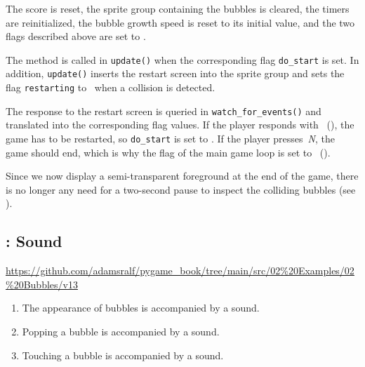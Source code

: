 The score is reset, the sprite group containing the bubbles is cleared, the timers are reinitialized, the bubble growth speed is reset to its initial value, and the two flags described above are set to \false.


The method is called in \texttt{update()} when the corresponding flag \texttt{do\_start} is set. In addition, \texttt{update()} inserts the restart screen into the sprite group and sets the flag \texttt{restarting} to \true\ when a collision is detected.

\newpage
{}  

The response to the restart screen is queried in \texttt{watch\_for\_events()} and translated into the corresponding flag values. If the player responds with~ (), the game has to be restarted, so \texttt{do\_start} is set to \true. If the player presses~\emph{N}, the game should end, which is why the flag of the main game loop is set to \false\ ().

  
Since we now display a semi-transparent foreground at the end of the game, there is no longer any need for a two-second pause to inspect the colliding bubbles (see ).


\subsection{: Sound}
\begin{diskbox}
	\url{https://github.com/adamsralf/pygame_book/tree/main/src/02%20Examples/02%20Bubbles/v13}
\end{diskbox}

\begin{enumerate}
	\item The appearance of bubbles is accompanied by a sound.\label{reqSoundErscheinen}
	\item Popping a bubble is accompanied by a sound.\label{reqSoundZerstechen}
	\item Touching a bubble is accompanied by a sound.\label{reqSoundBerühren}
\end{enumerate}
\er

